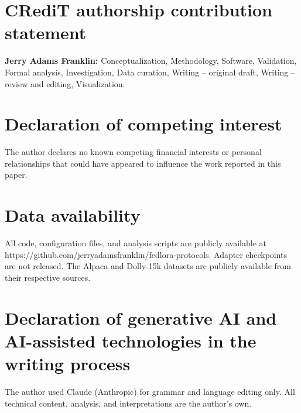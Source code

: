 \documentclass[preprint,review,12pt]{elsarticle}
\begin{document}


\section*{CRediT authorship contribution statement}
\textbf{Jerry Adams Franklin:} Conceptualization, Methodology, Software,
Validation, Formal analysis, Investigation, Data curation, Writing -- original
draft, Writing -- review and editing, Visualization.

\section*{Declaration of competing interest}
The author declares no known competing financial interests or personal
relationships that could have appeared to influence the work reported in this
paper.

\section*{Data availability}
All code, configuration files, and analysis scripts are publicly available at
https://github.com/jerryadamsfranklin/fedlora-protocols. Adapter checkpoints
are not released. The Alpaca and Dolly-15k datasets are publicly available from
their respective sources.

\section*{Declaration of generative AI and AI-assisted technologies in the writing process}
The author used Claude (Anthropic) for grammar and language editing only. All
technical content, analysis, and interpretations are the author's own.





\end{document}
